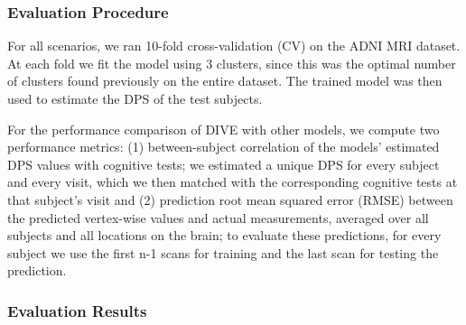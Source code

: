 \subsubsection{Evaluation Procedure}

For all scenarios, we ran 10-fold cross-validation (CV) on the ADNI MRI dataset. At each fold we fit the model using 3 clusters, since this was the optimal number of clusters found previously on the entire dataset. The trained model was then used to estimate the DPS of the test subjects. 

For the performance comparison of DIVE with other models, we compute two performance metrics: (1) between-subject correlation of the models' estimated DPS values with cognitive tests; we estimated a unique DPS for every subject and every visit, which we then matched with the corresponding cognitive tests at that subject's visit and (2) prediction root mean squared error (RMSE) between the predicted vertex-wise values and actual measurements, averaged over all subjects and all locations on the brain; to evaluate these predictions, for every subject we use the first n-1 scans for training and the last scan for testing the prediction.


\subsubsection{Evaluation Results}


\newcommand{\outFoldADNICVbrains}{images/vwdpm/crossvalid/adniThavgFWHM0Initk-meansCl3Pr0Ra1_VWDPMMean}
\newcommand{\outFoldADNIPetCVbrains}{figures/validAdniPET/brainAtrophyExtent}

\newcommand{\adniThickCVExpName}{adniThInitk-meansCl3Pr1Ra1_VDPM_MRF}
\newcommand{\adniThickCVFolder}{\voxDpmFolder/resfiles/cogCorr/\adniThickCVExpName}
\newcommand{\trimModelValidTop}{0}

